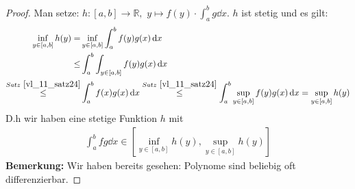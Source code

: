 \begin{proof}
 	Man setze: $h: [a,b] \rightarrow \mathbb{R},$ $y \mapsto f(y) 
	\cdot \int_a^b g \dd{x}$. $h$ ist stetig und es gilt:
	\begin{align*}
		\inf_{y \in [a,b]} h(y) = & \inf_{y \in [a,b]} \int_a^b f(y) g(x) \dd{x} \\
		\leq & \int_a^b \int_{y \in [a,b]} f(y) g(x) \dd{x} \\
		 \overset{Satz~\ref{vl_11_satz24}}{\le} & \int_a^bf(x)g(x) \dd{x} 
		\overset{Satz~\ref{vl_11_satz24}}{\le}
		\int_a^b \sup_{y \in [a,b]} f(y) g(x) \dd{x} = \sup_{y \in [a,b]} h(y)
	\end{align*}
	D.h wir haben eine stetige Funktion $h$ mit 
	\begin{align*}
		\int_a^b fg\dd{x} \in [\inf_{y \in [a,b]} h(y),  \sup_{y \in [a,b]} h(y)]
	\end{align*}
	\textbf{Bemerkung:} Wir haben bereits gesehen: Polynome sind beliebig oft
	 differenzierbar.	
\end{proof}